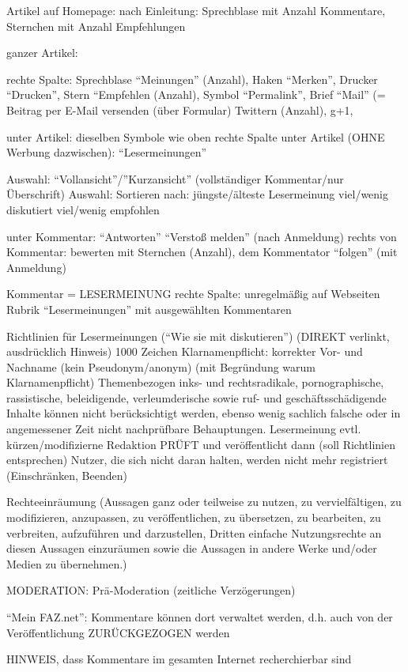 Artikel auf Homepage: nach Einleitung: Sprechblase mit Anzahl Kommentare, Sternchen mit Anzahl Empfehlungen

ganzer Artikel: 

rechte Spalte: Sprechblase ``Meinungen'' (Anzahl), Haken ``Merken'', Drucker ``Drucken'', Stern ``Empfehlen (Anzahl), Symbol ``Permalink'', Brief ``Mail'' (= Beitrag per E-Mail versenden (über Formular)
Twittern (Anzahl), g+1, 

unter Artikel: dieselben Symbole wie oben rechte Spalte
unter Artikel (OHNE Werbung dazwischen): ``Lesermeinungen''

Auswahl: ``Vollansicht''/''Kurzansicht'' (vollständiger Kommentar/nur Überschrift)
Auswahl: Sortieren nach: 
	jüngste/älteste Lesermeinung
	viel/wenig diskutiert
	viel/wenig empfohlen
	
unter Kommentar: ``Antworten'' ``Verstoß melden'' (nach Anmeldung)
rechts von Kommentar: bewerten mit Sternchen (Anzahl), dem Kommentator ``folgen'' (mit Anmeldung)

Kommentar = LESERMEINUNG
rechte Spalte: unregelmäßig auf Webseiten Rubrik ``Lesermeinungen'' mit ausgewählten Kommentaren


Richtlinien für Lesermeinungen (``Wie sie mit diskutieren'') (DIREKT verlinkt, ausdrücklich Hinweis)
1000 Zeichen
Klarnamenpflicht: korrekter Vor- und Nachname (kein Pseudonym/anonym) (mit Begründung warum Klarnamenpflicht)
Themenbezogen 
inks- und rechtsradikale, pornographische, rassistische, beleidigende, verleumderische sowie ruf- und geschäftsschädigende Inhalte können nicht berücksichtigt werden, ebenso wenig sachlich falsche oder in angemessener Zeit nicht nachprüfbare Behauptungen. 
Lesermeinung evtl. kürzen/modifizierne
Redaktion PRÜFT und veröffentlicht dann (soll Richtlinien entsprechen) 
Nutzer, die sich nicht daran halten, werden nicht mehr registriert (Einschränken, Beenden)


Rechteeinräumung (Aussagen ganz oder teilweise zu nutzen, zu vervielfältigen, zu modifizieren, anzupassen, zu veröffentlichen, zu übersetzen, zu bearbeiten, zu verbreiten, aufzuführen und darzustellen, Dritten einfache Nutzungsrechte an diesen Aussagen einzuräumen sowie die Aussagen in andere Werke und/oder Medien zu übernehmen.)

MODERATION: Prä-Moderation (zeitliche Verzögerungen)

``Mein FAZ.net'': 
	Kommentare können dort verwaltet werden, d.h. auch von der Veröffentlichung 					ZURÜCKGEZOGEN werden

HINWEIS, dass Kommentare im gesamten Internet recherchierbar sind


